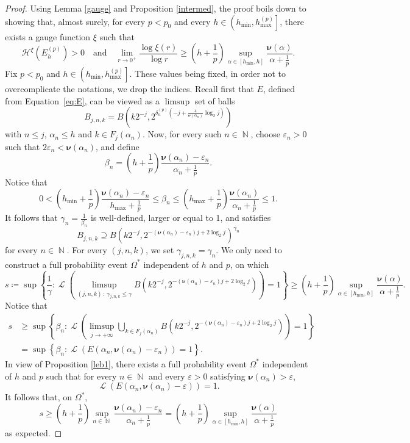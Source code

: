 \documentclass[a4paper,11pt,oneside]{article}
\DeclareMathOperator{\N}{\mathbb{N}}
\DeclareMathOperator{\leb}{\mathcal{L}}
\newcommand{\ccint}[1]{\left[{#1}\right]}
\newcommand{\ocint}[1]{\left({#1}\right]}
\theoremstyle{definition}
\theoremstyle{plain}
\begin{document}
\begin{proof}
Using Lemma \ref{gauge} and Proposition \ref{intermed}, the proof boils down to showing that, almost surely, for every $p<p_0$ and every $h\in\ocint{h_{\min},h_{\max}^{(p)}}$, there exists a gauge function $\xi$ such that
\[
\mathcal{H}^\xi\left(E_h^{(p)}\right)>0\quad\text{and}\quad \lim_{r\rightarrow0^+}\frac{\log\xi(r)}{\log r}\geq \left(h+\frac{1}{p}\right)\sup_{\alpha\in\ccint{h_{\min},h}}\frac{\bm{\nu}(\alpha)}{\alpha+\frac{1}{p}}.
\]
Fix $p<p_0$ and $h\in\ocint{h_{\min},h_{\max}^{(p)}}$. These values being fixed, in order not to overcomplicate the notations, we drop the indices. Recall first that $E$, defined from Equation~\eqref{eq:E}, can be viewed as a $\limsup$ set of balls
\[
B_{j,n,k}=B\left(k2^{-j},2^{\delta_n^{(p)}\left(-j+\frac{4}{\bm{\nu}(\alpha_n)}\log_2j\right)}\right)
\]
with $n\leq j$, $\alpha_n\leq h$ and $k\in F_j(\alpha_n)$. Now, for every such $n\in\N$, choose $\varepsilon_n>0$ such that $2\varepsilon_n<\bm{\nu}(\alpha_{n})$, and define
\[
\beta_n=\left(h+\frac{1}{p}\right)\frac{\bm{\nu}(\alpha_{n})-\varepsilon_n}{\alpha_{n}+\frac{1}{p}}.
\]
Notice that
\[
0<\left(h_{\min}+\frac{1}{p}\right)\frac{\bm{\nu}(\alpha_{n})-\varepsilon_n}{h_{\max}+\frac{1}{p}}\leq\beta_n\leq\left(h_{\max}+\frac{1}{p}\right)\frac{\bm{\nu}(\alpha_{n})}{\alpha_{n}+\frac{1}{p}}\leq1.
\]
It follows that $\gamma_n=\frac{1}{\beta_n}$ is well-defined, larger or equal to 1, and satisfies
\[
B_{j,n,k}\supseteq B\left(k2^{-j},2^{-(\bm{\nu}(\alpha_{n})-\varepsilon_n)j+2\log_2j}\right)^{\gamma_n}
\]
for every $n\in\N$. For every $(j,n,k)$, we set $\gamma_{j,n,k}=\gamma_n$. We only need to construct a full probability event $\Omega^\ast$ independent of $h$ and $p$, on which
\small\[
s\coloneqq\sup\left\{\frac{1}{\gamma}:\leb\left(\limsup_{(j,n,k)\,:\,\gamma_{j,n,k}\leq\gamma}B\left(k2^{-j},2^{-(\bm{\nu}(\alpha_{n})-\varepsilon_n)j+2\log_2j}\right)\right)=1\right\}\geq\left(h+\frac{1}{p}\right)\sup_{\alpha\in\ccint{h_{\min},h}}\frac{\bm{\nu}(\alpha)}{\alpha+\frac{1}{p}}.
\]\normalsize
Notice that
\begin{align*}
s 
& \geq\sup\left\{\beta_n:\leb\left(\limsup_{j\rightarrow+\infty}\bigcup_{k\in F_j(\alpha_{n})}B\left(k2^{-j},2^{-(\bm{\nu}(\alpha_{n})-\varepsilon_n)j+2\log_2j}\right)\right)=1\right\} \\
& =\sup\left\{\beta_n:\leb(E(\alpha_{n},\bm{\nu}(\alpha_{n})-\varepsilon_n))=1\right\}.
\end{align*}
In view of Proposition \ref{leb1}, there exists a full probability event $\Omega^\ast$ independent of $h$ and $p$ such that for every $n\in\N$ and every $\varepsilon>0$ satisfying $\bm{\nu}(\alpha_n)>\varepsilon$,
\[
\leb(E(\alpha_n,\bm{\nu}(\alpha_n)-\varepsilon))=1.
\]
It follows that, on $\Omega^\ast$, 
\[
s\geq \left(h+\frac{1}{p}\right)\sup_{n\in\N}\frac{\bm{\nu}(\alpha_{n})-\varepsilon_n}{\alpha_{n}+\frac{1}{p}}=\left(h+\frac{1}{p}\right)\sup_{\alpha\in\ccint{h_{\min},h}}\frac{\bm{\nu}(\alpha)}{\alpha+\frac{1}{p}}
\]
as expected.
\end{proof}
\end{document}
